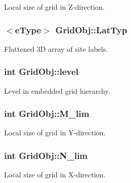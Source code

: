 Local size of grid in Z-\/direction. 

\subsubsection[{\texorpdfstring{Lat\+Typ}{LatTyp}}]{$<${\bf e\+Type}$>$ Grid\+Obj\+::\+Lat\+Typ}\hypertarget{class_grid_obj_a8ce077fba648f767361039eb924c45ae}{}\label{class_grid_obj_a8ce077fba648f767361039eb924c45ae}


Flattened 3D array of site labels. 

\subsubsection[{\texorpdfstring{level}{level}}]{\setlength{\rightskip}{0pt plus 5cm}int Grid\+Obj\+::level}\hypertarget{class_grid_obj_a7dfedc4442a386ec15c8b03ca899c1a9}{}\label{class_grid_obj_a7dfedc4442a386ec15c8b03ca899c1a9}


Level in embedded grid hierarchy. 

\subsubsection[{\texorpdfstring{M\+\_\+lim}{M_lim}}]{\setlength{\rightskip}{0pt plus 5cm}int Grid\+Obj\+::\+M\+\_\+lim}\hypertarget{class_grid_obj_a01d3f362634c896ecdb80f0e6304c12f}{}\label{class_grid_obj_a01d3f362634c896ecdb80f0e6304c12f}


Local size of grid in Y-\/direction. 

\subsubsection[{\texorpdfstring{N\+\_\+lim}{N_lim}}]{\setlength{\rightskip}{0pt plus 5cm}int Grid\+Obj\+::\+N\+\_\+lim}\hypertarget{class_grid_obj_a5eb35752a7c0741510975d9ee6aa3ce1}{}\label{class_grid_obj_a5eb35752a7c0741510975d9ee6aa3ce1}


Local size of grid in X-\/direction. 

